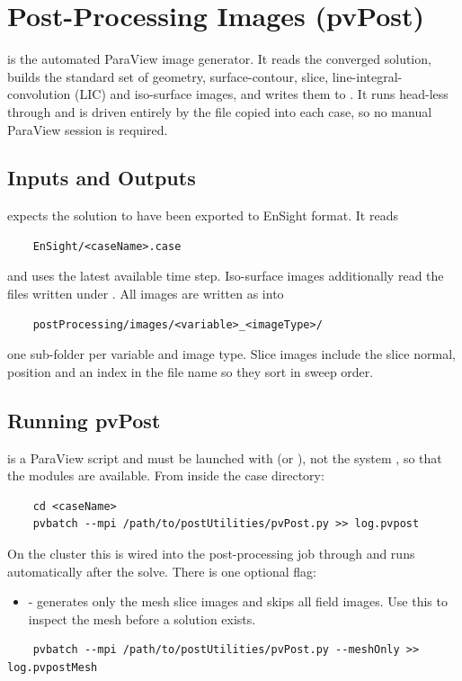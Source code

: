 \section{Post-Processing Images (pvPost)}
 is the automated ParaView image generator. It reads the converged solution, builds the standard set of geometry, surface-contour, slice, line-integral-convolution (LIC) and iso-surface images, and writes them to . It runs head-less through  and is driven entirely by the  file copied into each case, so no manual ParaView session is required.

\subsection{Inputs and Outputs}
 expects the solution to have been exported to EnSight format. It reads
\begin{lstlisting}
    EnSight/<caseName>.case
\end{lstlisting}
and uses the latest available time step. Iso-surface images additionally read the  files written under . All images are written as  into
\begin{lstlisting}
    postProcessing/images/<variable>_<imageType>/
\end{lstlisting}
one sub-folder per variable and image type. Slice images include the slice normal, position and an index in the file name so they sort in sweep order.

\subsection{Running pvPost}
 is a ParaView script and must be launched with  (or ), not the system , so that the  modules are available. From inside the case directory:
\begin{lstlisting}
    cd <caseName>
    pvbatch --mpi /path/to/postUtilities/pvPost.py >> log.pvpost
\end{lstlisting}
On the cluster this is wired into the post-processing job through  and runs automatically after the solve. There is one optional flag:
\begin{itemize}
    \item {} - generates only the mesh slice images and skips all field images. Use this to inspect the mesh before a solution exists.
\end{itemize}
\begin{lstlisting}
    pvbatch --mpi /path/to/postUtilities/pvPost.py --meshOnly >> log.pvpostMesh
\end{lstlisting}

